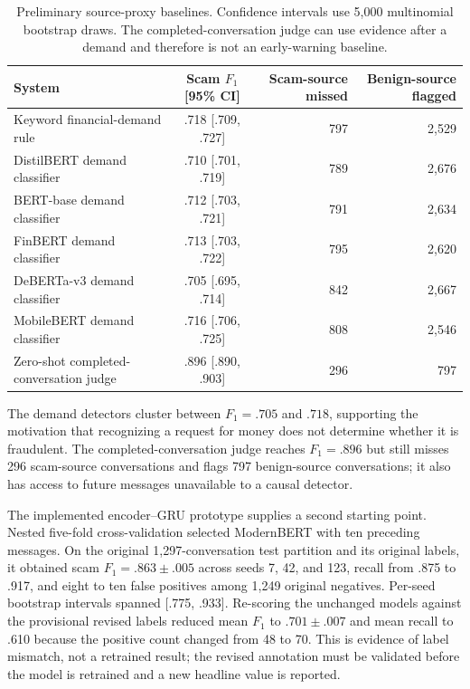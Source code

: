 \documentclass[letterpaper,11pt]{article}
\begin{document}
\begin{table}[tb]
\centering\scriptsize
\setlength{\tabcolsep}{3.5pt}
\begin{tabular}{@{}lcrr@{}}
\toprule
System & Scam $F_1$ [95\% CI] & Scam-source missed & Benign-source flagged \\
\midrule
Keyword financial-demand rule & .718 [.709, .727] & 797 & 2,529 \\
DistilBERT demand classifier & .710 [.701, .719] & 789 & 2,676 \\
BERT-base demand classifier & .712 [.703, .721] & 791 & 2,634 \\
FinBERT demand classifier & .713 [.703, .722] & 795 & 2,620 \\
DeBERTa-v3 demand classifier & .705 [.695, .714] & 842 & 2,667 \\
MobileBERT demand classifier & .716 [.706, .725] & 808 & 2,546 \\
Zero-shot completed-conversation judge & .896 [.890, .903] & 296 & 797 \\
\bottomrule
\end{tabular}
\caption{Preliminary source-proxy baselines. Confidence intervals use 5,000
multinomial bootstrap draws. The completed-conversation judge can use evidence
after a demand and therefore is not an early-warning baseline.}
\label{tab:baselines-22774}
\end{table}

The demand detectors cluster between $F_1=.705$ and $.718$, supporting the
motivation that recognizing a request for money does not determine whether it is
fraudulent. The completed-conversation judge reaches $F_1=.896$ but still misses
296 scam-source conversations and flags 797 benign-source conversations; it also
has access to future messages unavailable to a causal detector.

The implemented encoder--GRU prototype supplies a second starting point. Nested
five-fold cross-validation selected ModernBERT with ten preceding messages. On
the original 1,297-conversation test partition and its original labels, it
obtained scam $F_1=.863\pm.005$ across seeds 7, 42, and 123, recall from .875 to
.917, and eight to ten false positives among 1,249 original negatives. Per-seed
bootstrap intervals spanned [.775, .933]. Re-scoring the unchanged models against
the provisional revised labels reduced mean $F_1$ to $.701\pm.007$ and mean recall
to .610 because the positive count changed from 48 to 70. This is evidence of
label mismatch, not a retrained result; the revised annotation must be validated
before the model is retrained and a new headline value is reported.
\end{document}
